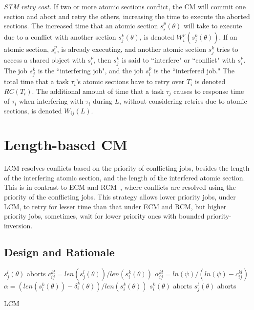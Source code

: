 \documentclass{sig-alternate}
\begin{document}
\textit{STM retry cost.} If two or more atomic sections conflict, the CM will commit one section and abort and retry the others, increasing the time to execute the aborted sections. The increased time that an atomic section $s_i^p (\theta)$ will take to execute due to a conflict with another section $s_j^k (\theta)$, is denoted $W_{i}^{p}(s_{j}^{k}(\theta))$. If an atomic section, $s_i^p$, is already executing, and another atomic section $s_j^k$ tries to access a shared object with $s_i^p$, then $s_j^k$ is said to ``interfere" or ``conflict" with $s_i^p$. The job $s_j^k$ is the ``interfering job", and the job $s_i^p$ is the ``interfered job."  
The total time that a task $\tau_i$'s atomic sections have to retry over $T_i$ is denoted $RC(T_i)$.
The additional amount of time that a task $\tau_j$ causes to response time of $\tau_i$ 
when interfering with $\tau_i$ during $L$, without considering retries due to atomic sections, is denoted $W_{ij}(L)$.

\section{Length-based CM}

LCM resolves conflicts based on the priority of conflicting jobs, besides the length of the interfering atomic section, and the length of the interfered atomic section. This is in contrast to ECM and RCM~\cite{stmconcurrencycontrol:emsoft11}, where conflicts are resolved using the priority of the conflicting jobs. This strategy allows lower priority jobs, under LCM, to retry for lesser time than that under ECM and RCM, but higher priority jobs, sometimes, wait for lower priority ones with bounded priority-inversion.

\subsection{\label{sec 9.1} Design and Rationale}

\begin{algorithm}
\footnotesize{
\LinesNumbered
{}
	{$s_j^l(\theta)$ aborts\label{step_sicommits}\;}
	{$c_{ij}^{kl}=len(s_j^l(\theta))/len(s_i^k(\theta))$\label{step_cijkl}\;
	$\alpha_{ij}^{kl}=ln(\psi)/(ln(\psi)-c_{ij}^{kl})$\label{step_alphaijkl}\;
	$\alpha=\left(len(s_i^k(\theta))-\delta_i^k(\theta)\right)/len(s_i^k(\theta))$\;
	{$s_i^k(\theta)$ aborts\label{step_siaborts}\;}
	{$s_j^l(\theta)$ aborts\label{step_sjaborts}\;}
	}
	}
\caption{LCM}
\label{alg_lcm}
\end{algorithm}
\end{document}
